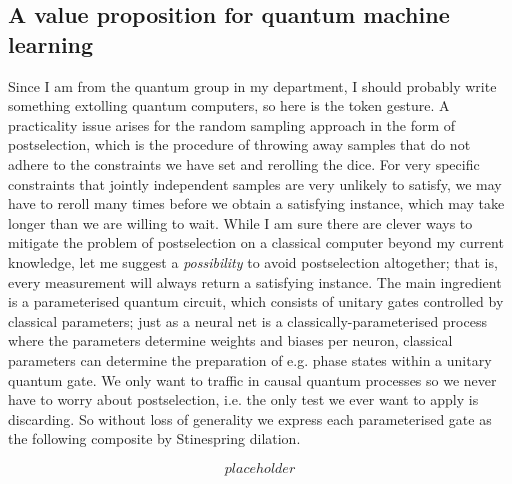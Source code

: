 \subsection{A value proposition for quantum machine learning}

Since I am from the quantum group in my department, I should probably write something extolling quantum computers, so here is the token gesture. A practicality issue arises for the random sampling approach in the form of postselection, which is the procedure of throwing away samples that do not adhere to the constraints we have set and rerolling the dice. For very specific constraints that jointly independent samples are very unlikely to satisfy, we may have to reroll many times before we obtain a satisfying instance, which may take longer than we are willing to wait. While I am sure there are clever ways to mitigate the problem of postselection on a classical computer beyond my current knowledge, let me suggest a \emph{possibility} to avoid postselection altogether; that is, every measurement will always return a satisfying instance. The main ingredient is a parameterised quantum circuit, which consists of unitary gates controlled by classical parameters; just as a neural net is a classically-parameterised process where the parameters determine weights and biases per neuron, classical parameters can determine the preparation of e.g. phase states within a unitary quantum gate. We only want to traffic in causal quantum processes so we never have to worry about postselection, i.e. the only test we ever want to apply is discarding. So without loss of generality we express each parameterised gate as the following composite by Stinespring dilation.

\[placeholder\]

